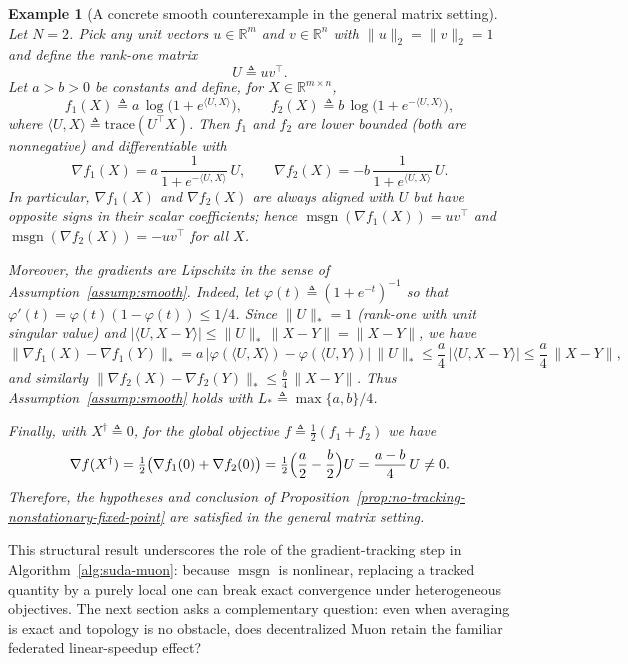 \documentclass{article}
\newtheorem{example}{Example}
\begin{document}
\begin{example}[A concrete smooth counterexample in the general matrix setting]
\label{ex:matrix-logistic-counterexample}
Let $N=2$.
Pick any unit vectors $u\in\mathbb{R}^m$ and $v\in\mathbb{R}^n$ with
$\|u\|_2=\|v\|_2=1$ and define the rank-one matrix
\[U\triangleq u v^\top.\]
Let $a>b>0$ be constants and define, for $X\in\mathbb{R}^{m\times n}$,
\[
 f_1(X)\triangleq a\,\log\bigl(1+e^{\langle U,X\rangle}\bigr),
 \qquad
 f_2(X)\triangleq b\,\log\bigl(1+e^{-\langle U,X\rangle}\bigr),
\]
where $\langle U,X\rangle\triangleq \mathrm{trace}(U^\top X)$.
Then $f_1$ and $f_2$ are lower bounded (both are nonnegative) and differentiable with
\[
\nabla f_1(X)= a\,\frac{1}{1+e^{-\langle U,X\rangle}}\,U,
\qquad
\nabla f_2(X)= -b\,\frac{1}{1+e^{\langle U,X\rangle}}\,U.
\]
In particular, $\nabla f_1(X)$ and $\nabla f_2(X)$ are always aligned with $U$ but have
opposite signs in their scalar coefficients; hence
$\operatorname{msgn}(\nabla f_1(X))=uv^\top$ and $\operatorname{msgn}(\nabla f_2(X))=-uv^\top$
for all $X$.

Moreover, the gradients are Lipschitz in the sense of Assumption~\ref{assump:smooth}.
Indeed, let $\varphi(t)\triangleq (1+e^{-t})^{-1}$ so that $\varphi'(t)=\varphi(t)(1-\varphi(t))\le 1/4$.
Since $\|U\|_* = 1$ (rank-one with unit singular value) and
$|\langle U, X-Y\rangle|\le \|U\|_*\,\|X-Y\|=\|X-Y\|$, we have
\[
\|\nabla f_1(X)-\nabla f_1(Y)\|_*
= a\,|\varphi(\langle U,X\rangle)-\varphi(\langle U,Y\rangle)|\,\|U\|_*
\le \frac{a}{4}\,|\langle U,X-Y\rangle|
\le \frac{a}{4}\,\|X-Y\|,
\]
and similarly $\|\nabla f_2(X)-\nabla f_2(Y)\|_*\le \frac{b}{4}\,\|X-Y\|$.
Thus Assumption~\ref{assump:smooth} holds with $L_*\triangleq \max\{a,b\}/4$.

Finally, with $X^\dagger\triangleq 0$, for the global objective
$f\triangleq \tfrac12(f_1+f_2)$ we have
\[
\nabla f(X^\dagger)=\tfrac12\bigl(\nabla f_1(0)+\nabla f_2(0)\bigr)
=\tfrac12\Bigl(\frac{a}{2}-\frac{b}{2}\Bigr)U
=\frac{a-b}{4}\,U\neq 0.
\]
Therefore, the hypotheses and conclusion of Proposition~\ref{prop:no-tracking-nonstationary-fixed-point}
are satisfied in the general matrix setting.
\end{example}

This structural result underscores the role of the gradient-tracking step in
Algorithm~\ref{alg:suda-muon}: because $\operatorname{msgn}$ is nonlinear,
replacing a tracked quantity by a purely local one can break exact convergence
under heterogeneous objectives. The next section asks a complementary question:
even when averaging is exact and topology is no obstacle, does decentralized
Muon retain the familiar federated linear-speedup effect?
\end{document}
